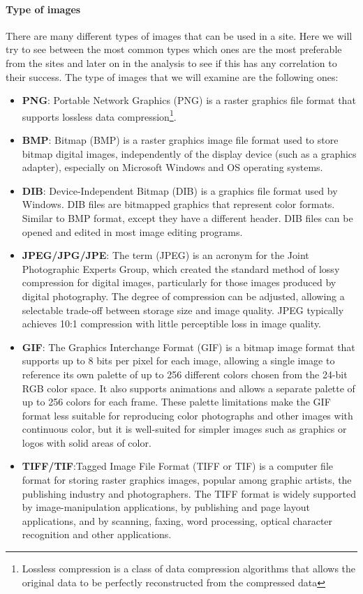 \documentclass{article}
\begin{document}
\paragraph{Type of images}
There are many different types of images that can be used in a site. Here we will try to see between the most common types which ones are the most preferable from the sites and later on in the analysis to see if this has any correlation to their success. The type of images that we will examine are the following ones:
\begin{itemize}
\item \textbf{PNG}: Portable Network Graphics (PNG) is a raster graphics file format that supports lossless data compression\footnote{Lossless compression is a class of data compression algorithms that allows the original data to be perfectly reconstructed from the compressed data}.
\item \textbf{BMP}: Bitmap (BMP) is a raster graphics image file format used to store bitmap digital images, independently of the display device (such as a graphics adapter), especially on Microsoft Windows and OS operating systems.
\item \textbf{DIB}: Device-Independent Bitmap (DIB) is a graphics file format used by Windows. DIB files are bitmapped graphics that represent color formats. Similar to BMP format, except they have a different header. DIB files can be opened and edited in most image editing programs.
\item \textbf{JPEG/JPG/JPE}: The term (JPEG) is an acronym for the Joint Photographic Experts Group, which created the standard method of lossy compression for digital images, particularly for those images produced by digital photography. The degree of compression can be adjusted, allowing a selectable trade-off between storage size and image quality. JPEG typically achieves 10:1 compression with little perceptible loss in image quality.
\item \textbf{GIF}: The Graphics Interchange Format (GIF) is a bitmap image format that supports up to 8 bits per pixel for each image, allowing a single image to reference its own palette of up to 256 different colors chosen from the 24-bit RGB color space. It also supports animations and allows a separate palette of up to 256 colors for each frame. These palette limitations make the GIF format less suitable for reproducing color photographs and other images with continuous color, but it is well-suited for simpler images such as graphics or logos with solid areas of color.
\item \textbf{TIFF/TIF}:Tagged Image File Format (TIFF or TIF) is a computer file format for storing raster graphics images, popular among graphic artists, the publishing industry and photographers. The TIFF format is widely supported by image-manipulation applications, by publishing and page layout applications, and by scanning, faxing, word processing, optical character recognition and other applications.
\end{itemize}
\end{document}

